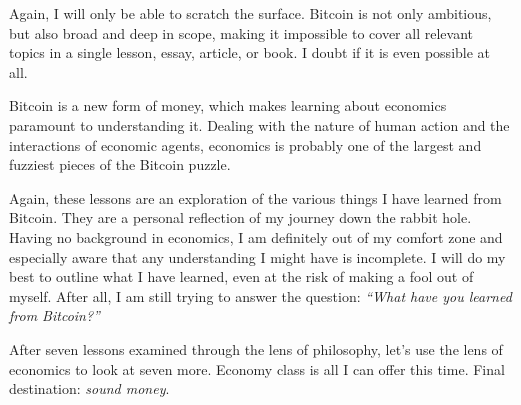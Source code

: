 Again, I will only be able to scratch the surface. Bitcoin is not only
ambitious, but also broad and deep in scope, making it impossible to cover all
relevant topics in a single lesson, essay, article, or book. I doubt if it is
even possible at all.

Bitcoin is a new form of money, which makes learning about
economics paramount to understanding it. Dealing with the nature of human action
and the interactions of economic agents, economics is probably one of the
largest and fuzziest pieces of the Bitcoin puzzle.

Again, these lessons are an exploration of the various things I have learned
from Bitcoin. They are a personal reflection of my journey down the rabbit hole.
Having no background in economics, I am definitely out of my comfort zone and
especially aware that any understanding I might have is incomplete. I will do my
best to outline what I have learned, even at the risk of making a fool out of
myself. After all, I am still trying to answer the question:
\textit{\enquote{What have you learned from Bitcoin?}}

After seven lessons examined through the lens of philosophy, let’s use the lens
of economics to look at seven more. Economy class is all I can offer this time.
Final destination: \textit{sound money}.

